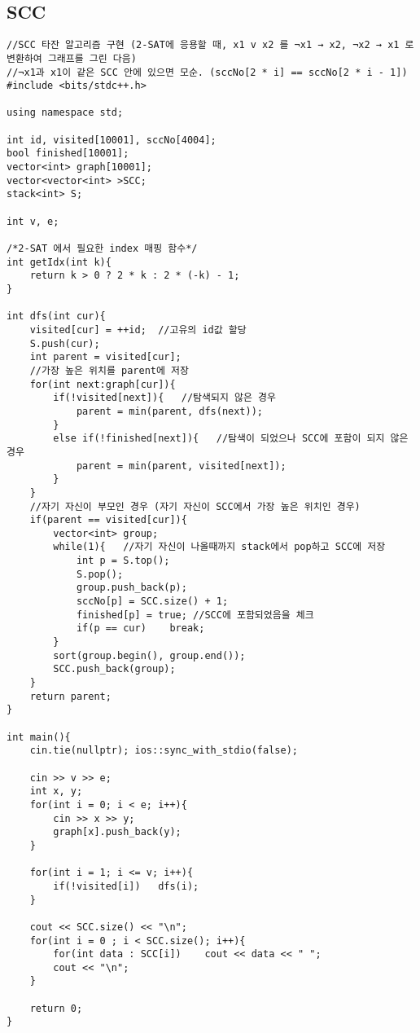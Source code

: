 \documentclass[landscape, 8pt, a4paper, oneside, twocolumn]{extarticle}
\begin{document}
    \subsection{SCC}
    \begin{verbatim}
//SCC 타잔 알고리즘 구현 (2-SAT에 응용할 때, x1 v x2 를 ¬x1 → x2, ¬x2 → x1 로 변환하여 그래프를 그린 다음)
//¬x1과 x1이 같은 SCC 안에 있으면 모순. (sccNo[2 * i] == sccNo[2 * i - 1])
#include <bits/stdc++.h>

using namespace std;

int id, visited[10001], sccNo[4004];
bool finished[10001];
vector<int> graph[10001];
vector<vector<int> >SCC;
stack<int> S;

int v, e;

/*2-SAT 에서 필요한 index 매핑 함수*/
int getIdx(int k){
	return k > 0 ? 2 * k : 2 * (-k) - 1;
}

int dfs(int cur){
    visited[cur] = ++id;  //고유의 id값 할당
    S.push(cur);
    int parent = visited[cur];
    //가장 높은 위치를 parent에 저장
    for(int next:graph[cur]){
        if(!visited[next]){   //탐색되지 않은 경우
            parent = min(parent, dfs(next));
        }
        else if(!finished[next]){   //탐색이 되었으나 SCC에 포함이 되지 않은 경우
            parent = min(parent, visited[next]);
        }
    }
    //자기 자신이 부모인 경우 (자기 자신이 SCC에서 가장 높은 위치인 경우)
    if(parent == visited[cur]){
        vector<int> group;
        while(1){   //자기 자신이 나올때까지 stack에서 pop하고 SCC에 저장
            int p = S.top();
            S.pop();
            group.push_back(p);
            sccNo[p] = SCC.size() + 1;
            finished[p] = true; //SCC에 포함되었음을 체크
            if(p == cur)    break;
        }
        sort(group.begin(), group.end());
        SCC.push_back(group);
    }
    return parent;
}

int main(){
    cin.tie(nullptr); ios::sync_with_stdio(false);

    cin >> v >> e;
    int x, y;
    for(int i = 0; i < e; i++){
        cin >> x >> y;
        graph[x].push_back(y);
    }

    for(int i = 1; i <= v; i++){
        if(!visited[i])   dfs(i);
    }

    cout << SCC.size() << "\n";
    for(int i = 0 ; i < SCC.size(); i++){
        for(int data : SCC[i])    cout << data << " ";
        cout << "\n";
    }

    return 0;
}
    \end{verbatim}
\end{document}
